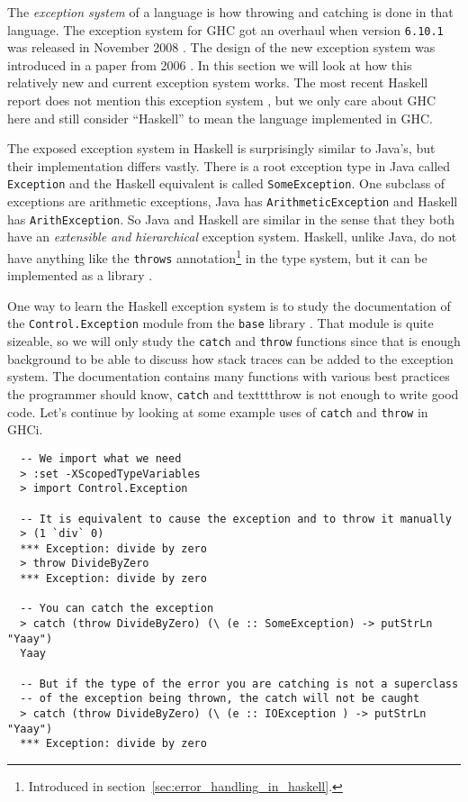 The \emph{exception system} of a language is how throwing and catching
is done in that language. The exception system for GHC got an
overhaul when version \texttt{6.10.1} was released in November 2008
\cite{haskell_org_release_6.10.1}. The design of the new exception
system was introduced in a paper from 2006 \cite{marlow2006extensible}.
In this section we will look at how this relatively new and current
exception system works. The most recent Haskell report does not mention
this exception system \cite[ch. 42]{haskell_report2010}, but we only
care about GHC here and still consider ``Haskell'' to mean the language
implemented in GHC.

The exposed exception system in Haskell is surprisingly similar to
Java's, but their implementation differs vastly.
There is a root exception type in Java called \texttt{Exception}
and the Haskell equivalent is called \texttt{SomeException}. One
subclass of exceptions are arithmetic exceptions, Java has
\texttt{ArithmeticException} and Haskell has \texttt{ArithException}.
So Java and Haskell are similar in the sense that they both have an
\emph{extensible and hierarchical} exception system.  Haskell, unlike
Java, do not have anything like the \texttt{throws}
annotation\footnote{Introduced in section~\ref{sec:error_handling_in_haskell}.}
in the type system, but it can be implemented as a library
\cite{github_pepeiborra_cme, hackage_control_monad_exception}.

One way to learn the Haskell exception system is to study the
documentation of the \texttt{Control.Exception} module from the
\texttt{base} library \cite{hackage_base_control_exception}.
That module is quite sizeable, so
we will only study the \texttt{catch} and \texttt{throw} functions since
that is enough background to be able to discuss how stack traces can be added
to the exception system. The documentation contains many functions with various best practices
the programmer should know, \texttt{catch} and
texttt{throw} is not enough to write good code. Let's continue by looking at some
example uses of \texttt{catch} and \texttt{throw} in GHCi.

\begin{verbatim}
  -- We import what we need
  > :set -XScopedTypeVariables
  > import Control.Exception

  -- It is equivalent to cause the exception and to throw it manually
  > (1 `div` 0)
  *** Exception: divide by zero
  > throw DivideByZero
  *** Exception: divide by zero

  -- You can catch the exception
  > catch (throw DivideByZero) (\ (e :: SomeException) -> putStrLn "Yaay")
  Yaay

  -- But if the type of the error you are catching is not a superclass
  -- of the exception being thrown, the catch will not be caught
  > catch (throw DivideByZero) (\ (e :: IOException ) -> putStrLn "Yaay")
  *** Exception: divide by zero
\end{verbatim}

